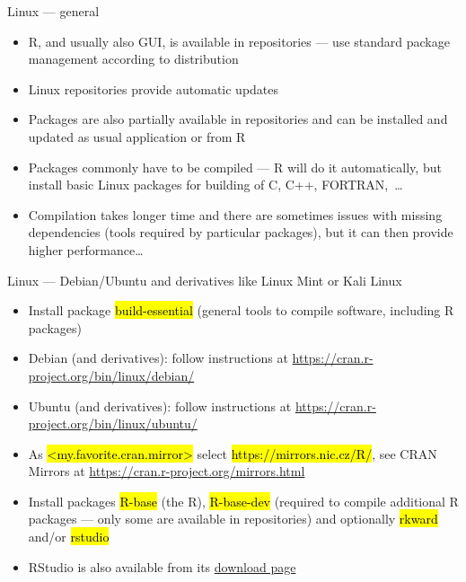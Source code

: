 \documentclass[compress, ucs, xelatex, 11pt, xcolor=svgnames,
  hyperref={
    bookmarks=true,
    unicode=true,
    colorlinks=true,
    pdftitle={Molecular data in R},
    plainpages=false,
    pdfauthor={Vojtech Zeisek},
    pdfsubject={Course about phylogeny and evolution in R},
    pdfcreator={XeLaTeX},
    pdfkeywords={R, evolution, phylogeny, molecular data},
    linkcolor=Tomato,
    anchorcolor=SaddleBrown,
    citecolor=Goldenrod,
    filecolor=DarkMagenta,
    menucolor=Sienna,
    urlcolor=DarkTurquoise,
    pdftex},
  url={hyphens, lowtilde} %
  ]{beamer}
\renewcommand{\texttt}[1]{\hl{\ttfamily #1}}
\begin{document}
\begin{frame}{Linux --- general}
  \begin{itemize}
    \item R, and usually also GUI, is available in repositories --- use standard package management according to distribution
    \item Linux repositories provide automatic updates
    \item Packages are also partially available in repositories and can be installed and updated as usual application or from R
    \item Packages commonly have to be compiled --- R will do it automatically, but install basic Linux packages for building of C, C++, FORTRAN,~\ldots
    \item Compilation takes longer time and there are sometimes issues with missing dependencies (tools required by particular packages), but it can then provide higher performance\ldots
  \end{itemize}
\end{frame}

\begin{frame}{Linux --- Debian/Ubuntu and derivatives like Linux Mint or Kali Linux}
  \begin{itemize}
    \item Install package \texttt{build-essential} (general tools to compile software, including R packages)
    \item Debian (and derivatives): follow instructions at \url{https://cran.r-project.org/bin/linux/debian/}
    \item Ubuntu (and derivatives): follow instructions at \url{https://cran.r-project.org/bin/linux/ubuntu/}
    \item As \texttt{<my.favorite.cran.mirror>} select \alert{\texttt{https://mirrors.nic.cz/R/}}, see \alert{CRAN Mirrors} at \url{https://cran.r-project.org/mirrors.html}
    \item Install packages \texttt{R-base} (the R), \texttt{R-base-dev} (required to compile additional R packages --- only some are available in repositories) and optionally \texttt{rkward} and/or \texttt{rstudio}
    \item RStudio is also available from its \href{https://www.rstudio.com/products/rstudio/download/\#download}{download page}
  \end{itemize}
\end{frame}
\end{document}
